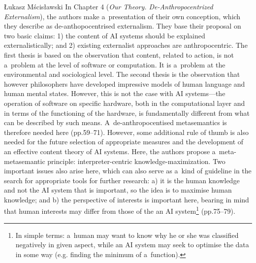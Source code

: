 \begin{newrevengenv}{Łukasz Mścisławski}
\enlargethispage{.5\baselineskip}
In Chapter 4 (\textit{Our Theory. De-Anthropocentrized Externalism}), the authors make a~presentation of their own conception, which they describe as de-anthopocentrised externalism. They base their proposal on two basic claims: 1) the content of AI systems should be explained externalistically; and 2) existing externalist approaches are anthropocentric. The first thesis is based on the observation that content, related to action, is not a~problem at the level of software or computation. It is a~problem at the environmental and sociological level. The second thesis is the observation that however philosophers have developed impressive models of human language and human mental states. However, this is not the case with AI systems---the operation of software on specific hardware, both in the computational layer and in terms of the functioning of the hardware, is fundamentally different from what can be described by such means. A~de-anthropocentised metasemantics is therefore needed here (pp.59--71). However, some additional rule of thumb is also needed for the future selection of appropriate measures and the development of an effective content theory of AI systems. Here, the authors propose a~meta-metasemantic principle: interpreter-centric knowledge-maximization. Two important issues also arise here, which can also serve as a~kind of guideline in the search for appropriate tools for further research: a) it is the human knowledge and not the AI system that is important, so the idea is to maximise human knowledge; and b) the perspective of interests is important here, bearing in mind that human interests may differ from those of the an AI system\footnote{In simple terms: a~human may want to know why he or she was classified negatively in given aspect, while an AI system may seek to optimise the data in some way (e.g. finding the minimum of a~function).} (pp.75--79).


\end{newrevengenv}
